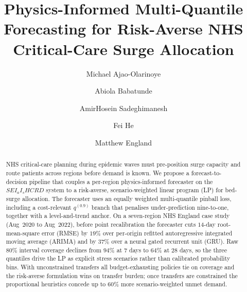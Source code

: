 \documentclass{svproc}
\begin{document}
\title{Physics-Informed Multi-Quantile Forecasting for Risk-Averse NHS Critical-Care Surge Allocation}

\author{Michael Ajao-Olarinoye \and
        Abiola Babatunde \and
        AmirHosein Sadeghimanesh \and
        Fei He \and
        Matthew England}


\maketitle

\begin{abstract}
NHS critical-care planning during epidemic waves must pre-position surge capacity and route patients across regions before demand is known. We propose a forecast-to-decision pipeline that couples a per-region physics-informed forecaster on the $SEI_aI_sHCRD$ system to a risk-averse, scenario-weighted linear program (LP) for bed-surge allocation. The forecaster uses an equally weighted multi-quantile pinball loss, including a cost-relevant $q^{(0.9)}$ branch that penalises under-prediction nine-to-one, together with a level-and-trend anchor. On a seven-region NHS England case study (Aug~$2020$ to Aug~$2022$), before point recalibration the forecaster cuts $14$-day root-mean-square error (RMSE) by $19\%$ over per-origin refitted autoregressive integrated moving average (ARIMA) and by $37\%$ over a neural gated recurrent unit (GRU). Raw $80\%$ interval coverage declines from $94\%$ at $7$ days to $64\%$ at $28$ days, so the three quantiles drive the LP as explicit stress scenarios rather than calibrated probability bins. With unconstrained transfers all budget-exhausting policies tie on coverage and the risk-averse formulation wins on transfer burden; once transfers are constrained the proportional heuristics concede up to $60\%$ more scenario-weighted unmet demand.

\end{abstract}
\end{document}
